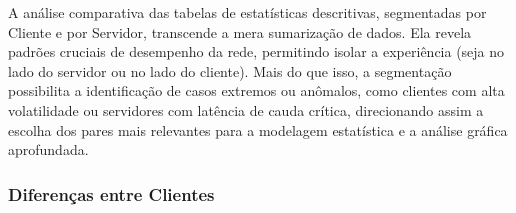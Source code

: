 \documentclass{article}
\begin{document}
\begin{table}[H]
	\centering
	\caption{Estatísticas descritivas das variáveis contínuas (Server 07).}
	\label{tab:desc_stats_s07}
\end{table}

A análise comparativa das tabelas de estatísticas descritivas, segmentadas por Cliente e por Servidor, transcende a mera sumarização de dados. Ela revela padrões cruciais de desempenho da rede, permitindo isolar a experiência (seja no lado do servidor ou no lado do cliente). Mais do que isso, a segmentação possibilita a identificação de casos extremos ou anômalos, como clientes com alta volatilidade ou servidores com latência de cauda crítica, direcionando assim a escolha dos pares mais relevantes para a modelagem estatística e a análise gráfica aprofundada.

\subsubsection{Diferenças entre Clientes}
\end{document}
